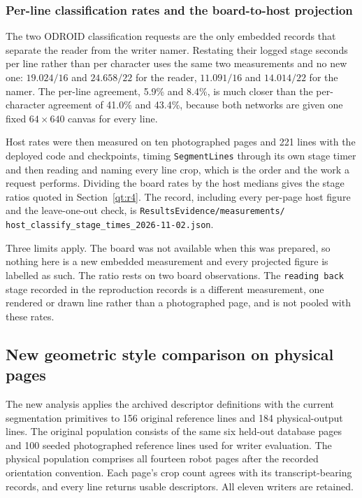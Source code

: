 \subsubsection{Per-line classification rates and the board-to-host projection}
The two ODROID classification requests are the only embedded records that
separate the reader from the writer namer. Restating their logged stage
seconds per line rather than per character uses the same two measurements and
no new one: $19.024/16$ and $24.658/22$ for the reader, $11.091/16$ and
$14.014/22$ for the namer. The per-line agreement, 5.9\% and 8.4\%, is much
closer than the per-character agreement of 41.0\% and 43.4\%, because both
networks are given one fixed $64\times640$ canvas for every line.

Host rates were then measured on ten photographed pages and 221 lines with
the deployed code and checkpoints, timing \texttt{SegmentLines} through its
own stage timer and then reading and naming every line crop, which is the
order and the work a request performs. Dividing the board rates by the host
medians gives the stage ratios quoted in Section~\ref{qt:r4}. The record,
including every per-page host figure and the leave-one-out check, is
\texttt{ResultsEvidence/measurements/} \texttt{host\_classify\_stage\_times\_2026-11-02.json}.

Three limits apply. The board was not available when this was prepared, so
nothing here is a new embedded measurement and every projected figure is
labelled as such. The ratio rests on two board observations. The
\texttt{reading back} stage recorded in the reproduction records is a
different measurement, one rendered or drawn line rather than a photographed
page, and is not pooled with these rates.

\subsection{New geometric style comparison on physical pages}
\label{app:res-physical-style}
The new analysis applies the archived descriptor definitions with the current segmentation primitives to 156 original reference lines and 184 physical-output lines. The original population consists of the same six held-out database pages and 100 seeded photographed reference lines used for writer evaluation. The physical population comprises all fourteen robot pages after the recorded orientation convention. Each page's crop count agrees with its transcript-bearing records, and every line returns usable descriptors. All eleven writers are retained.

